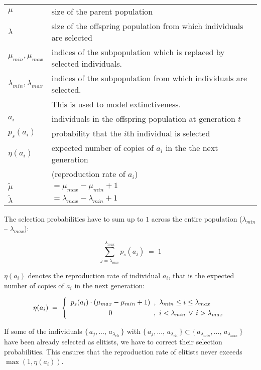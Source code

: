 \medskip

\begin{tabular}{ll}\label{selection:table:notation}
$\mu$ & size of the parent population \\
$\lambda$ & size of the offspring population from which individuals are selected \\
$\mu_{min}, \mu_{max}$ & indices of the subpopulation which is replaced by
 selected individuals. \\
$\lambda_{min}, \lambda_{max}$ & indices of the subpopulation from which
 individuals are selected.\\
& This is used to model extinctiveness. \\
$a_i$ & individuals in the offspring population at generation $t$ \\
$p_s(a_i)$ & probability that the $i$th individual is selected \\
$\eta(a_i)$ & expected number of copies of $a_i$ in the the next generation \\
& (reproduction rate of $a_i$) \\
$\tilde\mu$ & $= \mu_{max} - \mu_{min} + 1$ \\
$\tilde\lambda$ & $= \lambda_{max} - \lambda_{min} + 1$
\end{tabular}


\bigskip\bigskip
\noindent The selection probabilities have to sum up to $1$ across the entire
population ($\lambda_{min}$ -- $\lambda_{max}$):

\begin{equation}
  \sum_{j=\lambda_{min}}^{\lambda_{max}}p_s(a_j) \; = \; 1
\end{equation}

\noindent $\eta(a_i)$ denotes the reproduction rate of individual $a_i$,
that is the expected number of copies of $a_i$ in the next generation:

\begin{equation}
  \eta(a_i) \; = \; \left\{
    \begin{array}{c@{\hspace{0.5em},\hspace{0.5em}}l}
      p_s(a_i) \cdot (\mu_{max} - \mu_{min} + 1)
        & \lambda_{min} \le i \le \lambda_{max} \\[0.3em]
      0 & i < \lambda_{min} \, \vee \, i > \lambda_{max}
    \end{array}
  \right.
\end{equation}

\noindent If some of the individuals $\{\,a_j,...,\,a_{\lambda_{eli}}\,\}$ 
with 
$
  \{\,a_j,...,\,a_{\lambda_{eli}}\,\} \subset
  \{\,a_{\lambda_{min}},...,\,a_{\lambda_{max}}\,\}
$
have been already selected as elitists,
we have to correct their selection probabilities.  This ensures that
the reproduction rate of elitists never exceeds $\max(1,\eta(a_i))$.

